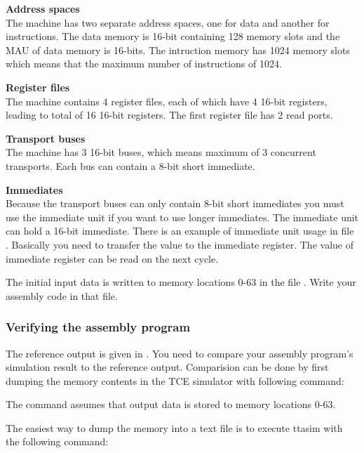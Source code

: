 \documentclass[twoside]{tceusermanual}
\begin{document}
\textbf{Address spaces} \\
The machine has two separate address spaces, one for data and another for
instructions. The data memory is 16-bit containing 128 memory slots and the
MAU of data memory is 16-bits. The intruction memory has 1024 memory slots
which means that the maximum number of instructions of 1024.

\textbf{Register files} \\
The machine contains 4 register files, each of which have 4 16-bit registers,
leading to total of 16 16-bit registers.  The first register file
has 2 read ports.

\textbf{Transport buses} \\
The machine has 3 16-bit buses, which means maximum of 3 concurrent
transports. Each bus can contain a 8-bit short immediate.

\textbf{Immediates} \\
Because the transport buses can only contain 8-bit short immediates you must
use the immediate unit if you want to use longer immediates. The immediate unit
can hold a 16-bit immediate. There is an example of immediate unit usage in
file . Basically you need to transfer the value to the
immediate register. The value of immediate register can be read on the next
cycle.

The initial input data is written to memory locations 0-63 in the file
. Write your assembly code in that file.

\subsubsection{Verifying the assembly program}

The reference output is given in . You need to
compare your assembly program's simulation result to the reference
output. Comparision can be done by first dumping the memory contents in the
TCE simulator with following command:


The command assumes that output data is stored to memory locations 0-63.

The easiest way to dump the memory into a text file is to execute ttasim with
the following command:

\end{document}
